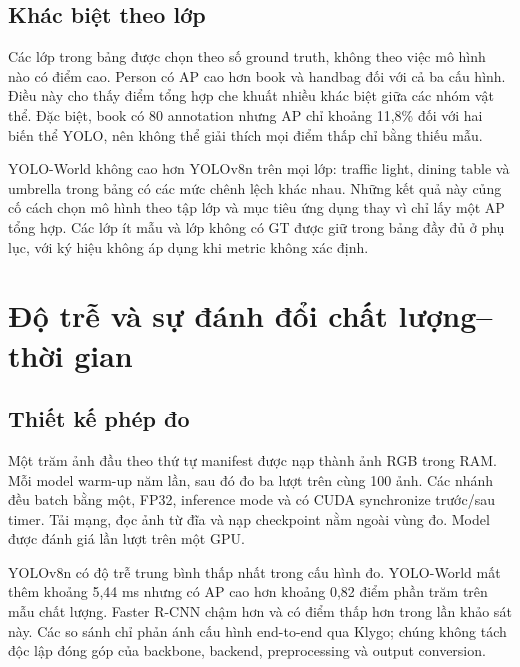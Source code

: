 \subsection{Khác biệt theo lớp}
\begin{table}[H]\centering\small
\caption{AP theo lớp của 12 lớp nhiều GT nhất; các cột mô hình là AP tính bằng phần trăm}

\label{tab:classes}
\end{table}
Các lớp trong bảng được chọn theo số ground truth, không theo việc mô hình nào có điểm cao. Person có AP cao hơn book và handbag đối với cả ba cấu hình. Điều này cho thấy điểm tổng hợp che khuất nhiều khác biệt giữa các nhóm vật thể. Đặc biệt, book có 80 annotation nhưng AP chỉ khoảng 11,8\% đối với hai biến thể YOLO, nên không thể giải thích mọi điểm thấp chỉ bằng thiếu mẫu.

YOLO-World không cao hơn YOLOv8n trên mọi lớp: traffic light, dining table và umbrella trong bảng có các mức chênh lệch khác nhau. Những kết quả này củng cố cách chọn mô hình theo tập lớp và mục tiêu ứng dụng thay vì chỉ lấy một AP tổng hợp. Các lớp ít mẫu và lớp không có GT được giữ trong bảng đầy đủ ở phụ lục, với ký hiệu không áp dụng khi metric không xác định.

\section{Độ trễ và sự đánh đổi chất lượng--thời gian}
\subsection{Thiết kế phép đo}
Một trăm ảnh đầu theo thứ tự manifest được nạp thành ảnh RGB trong RAM. Mỗi model warm-up năm lần, sau đó đo ba lượt trên cùng 100 ảnh. Các nhánh đều batch bằng một, FP32, inference mode và có CUDA synchronize trước/sau timer. Tải mạng, đọc ảnh từ đĩa và nạp checkpoint nằm ngoài vùng đo. Model được đánh giá lần lượt trên một GPU.

\begin{table}[H]\centering
\caption{Thời gian predict trên 100 ảnh, ba lượt; 300 lần gọi mỗi model}

\label{tab:latency}
\end{table}
YOLOv8n có độ trễ trung bình thấp nhất trong cấu hình đo. YOLO-World mất thêm khoảng 5,44 ms nhưng có AP cao hơn khoảng 0,82 điểm phần trăm trên mẫu chất lượng. Faster R-CNN chậm hơn và có điểm thấp hơn trong lần khảo sát này. Các so sánh chỉ phản ánh cấu hình end-to-end qua Klygo; chúng không tách độc lập đóng góp của backbone, backend, preprocessing và output conversion.

